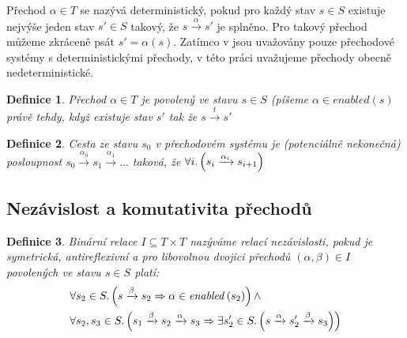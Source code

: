 \documentclass{fithesis2}
\newtheorem{definition}{Definice}
\begin{document}
Přechod $\alpha \in T$ se nazývá deterministický, pokud pro každý stav $s \in S$ existuje nejvýše jeden stav $s\prime \in S$ takový, že $s \xrightarrow{\alpha} s\prime$ je splněno. Pro takový přechod můžeme zkráceně psát $s\prime = \alpha(s)$. Zatímco v \cite{CLARKE} jsou uvažovány pouze přechodové systémy s deterministickými přechody, v této práci uvažujeme přechody obecně nedeterministické.


\begin{definition}
Přechod $\alpha \in T$ je povolený ve stavu $s \in S$ (píšeme $\alpha \in \mathit{enabled}(s)$ právě tehdy, když existuje stav $s'$ tak že $s \xrightarrow{t} s'$
\end{definition}

\begin{definition}
Cesta ze stavu $s_0$ v přechodovém systému je (potenciálně nekonečná) posloupnost $s_0 \xrightarrow{\alpha_0} s_1 \xrightarrow{\alpha_1} \ldots $ taková, že $\forall i \ldotp \left({ s_i \xrightarrow{\alpha_i} s_{i+1} }\right)$
\end{definition}

\subsection{Nezávislost a komutativita přechodů}

\begin{definition}
Binární relace $I \subseteq T \times T$ nazýváme relací nezávislosti, pokud je symetrická, antireflexivní a pro libovolnou dvojici přechodů $(\alpha, \beta) \in I$ povolených ve stavu $s \in S$ platí:
\begin{equation}\label{eq:independent-my}
\begin{split}
&\forall s_2 \in S \ldotp
\left({
	s \xrightarrow{\beta} s_2
	\Rightarrow
	\alpha \in \mathit{enabled}\left({s_2}\right)
}\right)
\land \\
&\forall s_2, s_3 \in S \ldotp \left({
	s_1 \xrightarrow{\beta} s_2 \xrightarrow{\alpha} s_3
	\Rightarrow
	\exists s_2' \in S \ldotp \left({
		s \xrightarrow{\alpha} s_2' \xrightarrow{\beta} s_3
	}\right)
}\right)
\end{split}
\end{equation}
\end{definition}
\end{document}
